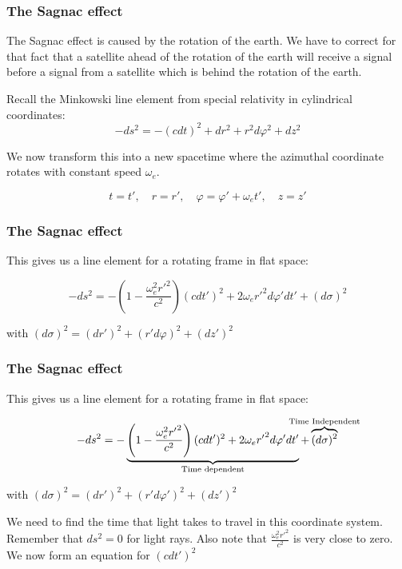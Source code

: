 \documentclass[xcolor=dvipsnames,usepdftitle=false]{beamer}
\renewcommand\phi{\varphi}
\begin{document}
\begin{frame}

\frametitle{The Sagnac effect}

The Sagnac effect is caused by the rotation of the earth. We have to correct for that fact that a satellite ahead of the rotation of the earth will receive a signal before a signal from a satellite which is behind the rotation of the earth. \pause

Recall the Minkowski line element from special relativity in cylindrical coordinates: \[ -ds^2 = -(c dt)^2 + dr^2 + r^2 d\phi^2 + dz^2 \]

We now transform this into a new spacetime where the azimuthal coordinate rotates with constant speed $\omega_{e}$. \pause

\[ t = t' , \,\,\,\,\,\, r=r', \,\,\,\,\,\, \phi = \phi' + \omega_{e} t', \,\,\,\,\,\, z = z' \]

\end{frame}

\begin{frame}

\frametitle{The Sagnac effect}

This gives us a line element for a rotating frame in flat space:

\[-ds^2 = - \left(1- \frac{\omega_{e}^2 {r'}^2}{c^2}\right)(cdt')^2 + 2 \omega_{e} {r'}^2 d\phi' dt' + (d\sigma)^2\]

\vspace{\baselineskip}

with $(d\sigma)^2 = (dr')^2 + (r' d \phi)^2 + (dz')^2$

\end{frame}

\begin{frame}

\frametitle{The Sagnac effect}

This gives us a line element for a rotating frame in flat space:

\[-ds^2 = - \underbrace{\left(1- \frac{\omega_{e}^2 {r'}^2}{c^2}\right)(cdt')^2 + 2 \omega_{e} {r'}^2 d\phi' dt'}_{\text{Time dependent}} + \overbrace{(d\sigma)^2}^{\mathclap{\text{Time Independent}}}\]

\vspace{\baselineskip}

with $(d\sigma)^2 = (dr')^2 + (r' d \phi')^2 + (dz')^2$ 

\vspace{\baselineskip} \pause

We need to find the time that light takes to travel in this coordinate system. Remember that $ds^2 = 0$ for light rays. Also note that $\frac{\omega_{e}^2 {r'}^2}{c^2}$ is very close to zero. We now form an equation for $(cdt')^2$

\end{frame}
\end{document}
